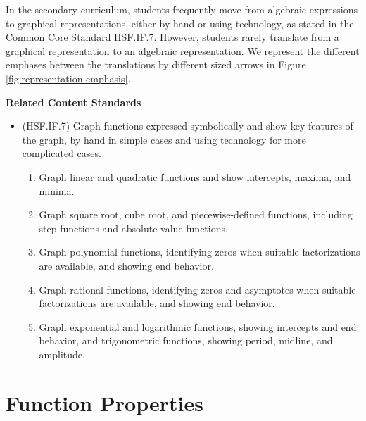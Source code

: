 \documentclass[
]{book}
\providecommand{\tightlist}{%
  \setlength{\itemsep}{0pt}\setlength{\parskip}{0pt}}
\newenvironment{standards}{}{}
\theoremstyle{definition}
\theoremstyle{definition}
\theoremstyle{definition}
\theoremstyle{definition}
\theoremstyle{remark}
\begin{document}
In the secondary curriculum, students frequently move from algebraic expressions to graphical representations, either by hand or using technology, as stated in the Common Core Standard HSF.IF.7. However, students rarely translate from a graphical representation to an algebraic representation. We represent the different emphases between the translations by different sized arrows in Figure \ref{fig:representation-emphasis}.

\begin{standards}

\begin{center}
\textbf{Related Content Standards}

\end{center}

\begin{itemize}
\tightlist
\item
  (HSF.IF.7) Graph functions expressed symbolically and show key features of the graph, by hand in simple cases and using technology for more complicated cases.

  \begin{enumerate}
  \def\labelenumi{\alph{enumi}.}
  \tightlist
  \item
    Graph linear and quadratic functions and show intercepts, maxima, and minima.
  \item
    Graph square root, cube root, and piecewise-defined functions, including step functions and absolute value functions.
  \item
    Graph polynomial functions, identifying zeros when suitable factorizations are available, and showing end behavior.
  \item
    Graph rational functions, identifying zeros and asymptotes when suitable factorizations are available, and showing end behavior.
  \item
    Graph exponential and logarithmic functions, showing intercepts and end behavior, and trigonometric functions, showing period, midline, and amplitude.
  \end{enumerate}
\end{itemize}

\end{standards}

\hypertarget{function-properties}{%
\section{Function Properties}\label{function-properties}}
\end{document}

